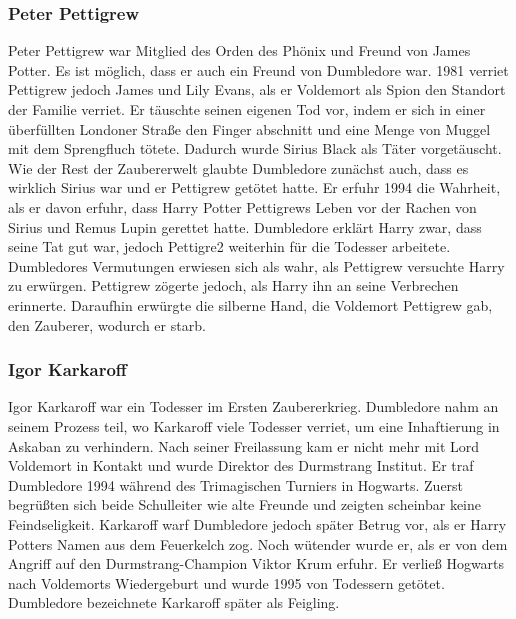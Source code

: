 \documentclass[a4paper, 10pt]{article}
\begin{document}
\subsubsection*{Peter Pettigrew}
Peter Pettigrew war Mitglied des Orden des Phönix und Freund von James Potter. Es ist möglich, dass er auch ein Freund von Dumbledore war. 1981 verriet Pettigrew jedoch James und Lily Evans, als er Voldemort als Spion den Standort der Familie verriet. Er täuschte seinen eigenen Tod vor, indem er sich in einer überfüllten Londoner Straße den Finger abschnitt und eine Menge von Muggel mit dem Sprengfluch tötete. Dadurch wurde Sirius Black als Täter vorgetäuscht. Wie der Rest der Zaubererwelt glaubte Dumbledore zunächst auch, dass es wirklich Sirius war und er Pettigrew getötet hatte. Er erfuhr 1994 die Wahrheit, als er davon erfuhr, dass Harry Potter Pettigrews Leben vor der Rachen von Sirius und Remus Lupin gerettet hatte. Dumbledore erklärt Harry zwar, dass seine Tat gut war, jedoch Pettigre2 weiterhin für die Todesser arbeitete. Dumbledores Vermutungen erwiesen sich als wahr, als Pettigrew versuchte Harry zu erwürgen. Pettigrew zögerte jedoch, als Harry ihn an seine Verbrechen erinnerte. Daraufhin erwürgte die silberne Hand, die Voldemort Pettigrew gab, den Zauberer, wodurch er starb.
\subsubsection*{Igor Karkaroff}
Igor Karkaroff war ein Todesser im Ersten Zaubererkrieg. Dumbledore nahm an seinem Prozess teil, wo Karkaroff viele Todesser verriet, um eine Inhaftierung in Askaban zu verhindern. Nach seiner Freilassung kam er nicht mehr mit Lord Voldemort in
Kontakt und wurde Direktor des Durmstrang Institut. Er traf Dumbledore 1994 während des Trimagischen Turniers in Hogwarts. Zuerst begrüßten sich beide Schulleiter wie alte Freunde und zeigten scheinbar keine Feindseligkeit. Karkaroff warf Dumbledore jedoch später Betrug vor, als er Harry Potters Namen aus dem Feuerkelch zog. Noch wütender wurde er, als er von dem Angriff auf den Durmstrang-Champion Viktor Krum erfuhr. Er verließ Hogwarts nach Voldemorts Wiedergeburt und wurde 1995 von Todessern getötet. Dumbledore bezeichnete Karkaroff später als Feigling.
\end{document}
